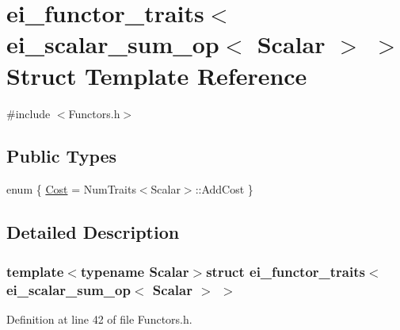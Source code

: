 \hypertarget{structei__functor__traits_3_01ei__scalar__sum__op_3_01_scalar_01_4_01_4}{\section{ei\-\_\-functor\-\_\-traits$<$ ei\-\_\-scalar\-\_\-sum\-\_\-op$<$ Scalar $>$ $>$ Struct Template Reference}
\label{structei__functor__traits_3_01ei__scalar__sum__op_3_01_scalar_01_4_01_4}
}


{\ttfamily \#include $<$Functors.\-h$>$}

\subsection*{Public Types}
\begin{DoxyCompactItemize}
\item 
enum \{ \hyperlink{structei__functor__traits_3_01ei__scalar__sum__op_3_01_scalar_01_4_01_4_aac55e4954ebd746ec1f824b7300ea504a5f60ca44023ffe1d4ac58f2e0b690855}{Cost} = Num\-Traits$<$Scalar$>$\-:\-:Add\-Cost
 \}
\end{DoxyCompactItemize}


\subsection{Detailed Description}
\subsubsection*{template$<$typename Scalar$>$struct ei\-\_\-functor\-\_\-traits$<$ ei\-\_\-scalar\-\_\-sum\-\_\-op$<$ Scalar $>$ $>$}



Definition at line 42 of file Functors.\-h.



